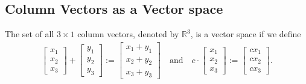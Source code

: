\documentclass[12pt,a4paper]{article}
\newcounter{example}[section]
\begin{document}
	\subsection{Column Vectors as a Vector space}
	\begin{example}
	The set of all $3 \times 1$ column vectors, denoted by $\mathbb{R}^3$, is a vector space if we define
		\begin{align*}
		\begin{bmatrix}
		x_1 \\ x_2 \\ x_3
		\end{bmatrix}
		+
		\begin{bmatrix}
		y_1 \\ y_2 \\ y_3
		\end{bmatrix}
		:=
		\begin{bmatrix}
		x_1 + y_1 \\
		x_2 + y_2 \\
		x_3 + y_3 
		\end{bmatrix}
		\quad \text{and} \quad
		c \cdot \begin{bmatrix}
		x_1 \\ x_2 \\ x_3
		\end{bmatrix}
		:= \begin{bmatrix}
		c x_1 \\ c x_2 \\ c x_3
		\end{bmatrix} .
		\end{align*}
	\end{example}
	
	\newpage
	
	\phantom{2}
	
	\vfill
	
\end{document}
